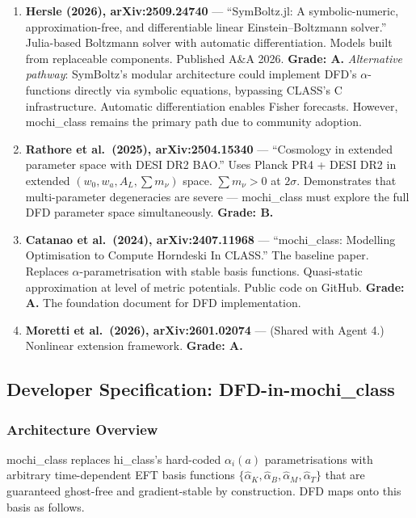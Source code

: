 \documentclass[11pt,a4paper]{article}
\begin{document}
\begin{enumerate}

\item \textbf{Hersle (2026), arXiv:2509.24740} --- ``SymBoltz.jl: A symbolic-numeric, approximation-free, and differentiable linear Einstein--Boltzmann solver.'' Julia-based Boltzmann solver with automatic differentiation. Models built from replaceable components. Published A\&A 2026. \textbf{Grade: A.} \emph{Alternative pathway}: SymBoltz's modular architecture could implement DFD's $\alpha$-functions directly via symbolic equations, bypassing CLASS's C infrastructure. Automatic differentiation enables Fisher forecasts. However, mochi\_class remains the primary path due to community adoption.

\item \textbf{Rathore et al.\ (2025), arXiv:2504.15340} --- ``Cosmology in extended parameter space with DESI DR2 BAO.'' Uses Planck PR4 + DESI DR2 in extended $(w_0, w_a, A_L, \sum m_\nu)$ space. $\sum m_\nu > 0$ at $2\sigma$. Demonstrates that multi-parameter degeneracies are severe --- mochi\_class must explore the full DFD parameter space simultaneously. \textbf{Grade: B.}

\item \textbf{Catanao et al.\ (2024), arXiv:2407.11968} --- ``mochi\_class: Modelling Optimisation to Compute Horndeski In CLASS.'' The baseline paper. Replaces $\alpha$-parametrisation with stable basis functions. Quasi-static approximation at level of metric potentials. Public code on GitHub. \textbf{Grade: A.} The foundation document for DFD implementation.

\item \textbf{Moretti et al.\ (2026), arXiv:2601.02074} --- (Shared with Agent 4.) Nonlinear extension framework. \textbf{Grade: A.}

\end{enumerate}

\subsection{Developer Specification: DFD-in-mochi\_class}

\subsubsection{Architecture Overview}

mochi\_class replaces hi\_class's hard-coded $\alpha_i(a)$ parametrisations with arbitrary time-dependent EFT basis functions $\{\hat{\alpha}_K, \hat{\alpha}_B, \hat{\alpha}_M, \hat{\alpha}_T\}$ that are guaranteed ghost-free and gradient-stable by construction. DFD maps onto this basis as follows.
\end{document}
